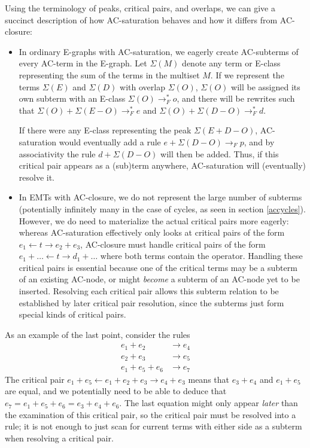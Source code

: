 \documentclass[12pt,a4paper,twoside,openright]{report}
\numberwithin{equation}{chapter}		%
\numberwithin{figure}{chapter}			%
\numberwithin{table}{chapter}			%
\theoremstyle{definition}
\theoremstyle{plain}
\begin{document}
Using the terminology of peaks, critical pairs, and overlaps, we can give a succinct description of how AC-saturation behaves and how it differs from AC-closure:
\begin{itemize}
	\item In ordinary E-graphs with AC-saturation, we eagerly create AC-subterms of every AC-term in the E-graph. Let $\Sigma(M)$ denote any term or E-class representing the sum of the terms in the multiset $M$. If we represent the terms $\Sigma(E)$ and $\Sigma(D)$ with overlap $\Sigma(O)$, $\Sigma(O)$ will be assigned its own subterm with an E-class $\Sigma(O) \rightarrow^*_F o$, and there will be rewrites such that $\Sigma(O) + \Sigma(E - O) \rightarrow^*_F e$ and $\Sigma(O) + \Sigma(D - O) \rightarrow^*_F d$.
	
	If there were any E-class representing the peak $\Sigma(E + D - O)$, AC-saturation would eventually add a rule $e + \Sigma(D - O) \rightarrow_F p$, and by associativity the rule $d + \Sigma(D - O)$ will then be added. Thus, if this critical pair appears as a (sub)term anywhere, AC-saturation will (eventually) resolve it.
	\item In EMTs with AC-closure, we do not represent the large number of subterms (potentially infinitely many in the case of cycles, as seen in section \ref{accycles}). However, we do need to materialize the actual critical pairs more eagerly: whereas AC-saturation effectively only looks at critical pairs of the form $e_1 \leftarrow t \rightarrow e_2 + e_3$, AC-closure must handle critical pairs of the form $e_1 + \ldots \leftarrow t \rightarrow d_1 + \ldots$ where both terms contain the operator. Handling these critical pairs is essential because one of the critical terms may be a subterm of an existing AC-node, or might \emph{become} a subterm of an AC-node yet to be inserted. Resolving each critical pair allows this subterm relation to be established by later critical pair resolution, since the subterms just form special kinds of critical pairs.
\end{itemize}

As an example of the last point, consider the rules
\begin{align}
	e_1 + e_2 &\rightarrow e_4 \\
	e_2 + e_3 &\rightarrow e_5 \\
	e_1 + e_5 + e_6 &\rightarrow e_7
\end{align}
The critical pair $e_1 + e_5 \leftarrow e_1 + e_2 + e_3 \rightarrow e_4 + e_3$ means that $e_3 + e_4$ and $e_1 + e_5$ are equal, and we potentially need to be able to deduce that $e_7 = e_1 + e_5 + e_6 = e_3 + e_4 + e_6$. The last equation might only appear \emph{later} than the examination of this critical pair, so the critical pair must be resolved into a rule; it is not enough to just scan for current terms with either side as a subterm when resolving a critical pair.
\end{document}
